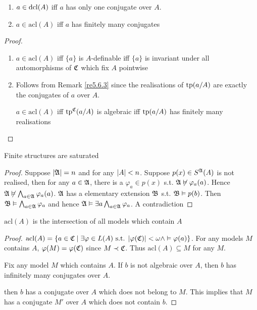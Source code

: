 \documentclass[11pt]{article}
\def \acl {\text{acl}}
\begin{document}
\begin{corollary}[]
\begin{enumerate}
\item \(a\in\operatorname{dcl}(A)\) iff \(a\) has only one conjugate over \(A\).
\item \(a\in\acl(A)\)  iff \(a\) has finitely many conjugates
\end{enumerate}
\end{corollary}

\begin{proof}
\begin{enumerate}
\item \(a\in\acl(A)\) iff \(\{a\}\) is \(A\)-definable iff \(\{a\}\) is invariant under all automorphisms
of \(\mathfrak{C}\) which fix \(A\) pointwise
\item Follows from Remark \ref{re5.6.3} since the realisations of \(\operatorname{tp}(a/A)\) are exactly the
conjugates of \(a\) over \(A\).

\(a\in\acl(A)\) iff \(\operatorname{tp}^{\mathfrak{C}}(a/A)\) is algebraic iff \(\operatorname{tp}(a/A)\) has finitely many realisations
\end{enumerate}
\end{proof}

\begin{exercise}
\label{6.1.1}
Finite structures are saturated
\end{exercise}

\begin{proof}
Suppose \(\abs{\fA}=n\) and for any \(\abs{A}<n\). Suppose \(p(x)\in S^{\mathfrak{A}}(A)\) is not realised,
then for any \(a\in\mathfrak{A}\), there is a \(\varphi_a\in p(x)\) s.t. \(\mathfrak{A}\not\vDash\varphi_a(a)\).
Hence \(\mathfrak{A}\not\vDash\bigwedge_{a\in\mathfrak{A}}\varphi_a(a)\). \(\mathfrak{A}\) has a elementary extension \(\mathfrak{B}\) s.t. \(\mathfrak{B}\vDash p(b)\). Then
\(\mathfrak{B}\vDash\bigwedge_{a\in\mathfrak{A}}\varphi_a\) and hence \(\mathfrak{A}\vDash\exists a\bigwedge_{a\in\mathfrak{A}}\varphi_a\). A contradiction
\end{proof}

\begin{exercise}
\label{6.1.2}
\(\acl(A)\) is the intersection of all models which contain \(A\)
\end{exercise}

\begin{proof}
\(\acl(A)=\{a\in\fC\mid\exists\varphi\in L(A)\text{ s.t. }\abs{\varphi(\fC)}<\omega\wedge\vDash\varphi(a)\}\). For any models \(M\)
contains \(A\), \(\varphi(M)=\varphi(\mathfrak{C})\) since \(M\prec\mathfrak{C}\). Thus \(\acl(A)\subseteq M\) for any \(M\).

Fix any model \(M\) which contains \(A\). If \(b\) is not algebraic over \(A\), then \(b\) has
infinitely many conjugates over \(A\).

then \(b\) has a
conjugate over \(A\) which does not belong to \(M\). This implies that \(M\) has a
conjugate \(M'\) over \(A\) which does not contain \(b\).
\end{proof}
\end{document}
